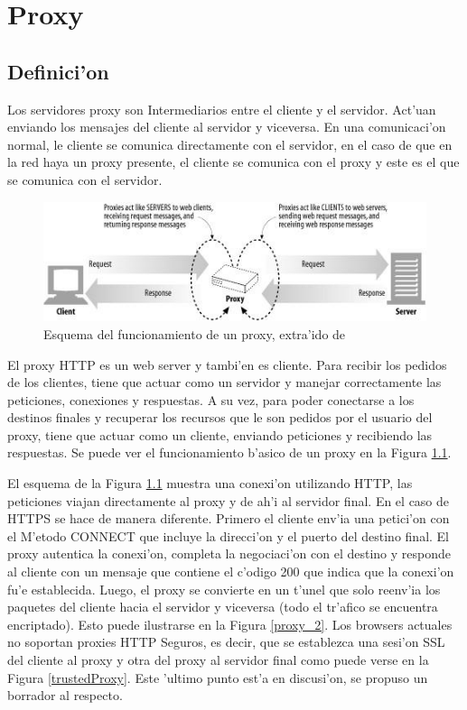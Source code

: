 \chapter{Proxy}
\label{proxy}
\section{Definici'on}

Los servidores proxy son Intermediarios entre el cliente y el servidor. Act'uan enviando los mensajes del cliente al servidor y viceversa. En una comunicaci'on normal, le cliente se comunica directamente con el servidor, en el caso de que en la red haya un proxy presente, el cliente se comunica con el proxy y este es el que se comunica con el servidor.

\begin{figure}[ht!]
  	\centering
	\includegraphics[width=\textwidth]{img/proxy_1}
	\caption{\small Esquema del funcionamiento de un proxy, extra'ido de \cite{httpGuide}}
	\label{proxy_1}
\end{figure}

El proxy HTTP es un web server y tambi'en es cliente. Para recibir los pedidos de los clientes, tiene que actuar como un servidor y manejar correctamente las peticiones, conexiones y respuestas. A su vez, para poder conectarse a los destinos finales y recuperar los recursos que le son pedidos por el usuario del proxy, tiene que actuar como un cliente, enviando peticiones y recibiendo las respuestas. Se puede ver el funcionamiento b'asico de un proxy en la Figura \ref{proxy_1}.

El esquema de la Figura \ref{proxy_1} muestra una conexi'on utilizando HTTP, las peticiones viajan directamente al proxy y de ah'i al servidor final. En el caso de HTTPS se hace de manera diferente. Primero el cliente env'ia una petici'on con el M'etodo CONNECT que incluye la direcci'on y el puerto del destino final. El proxy autentica la conexi'on, completa la negociaci'on con el destino y responde al cliente con un mensaje que contiene el c'odigo 200 que indica que la conexi'on fu'e establecida. Luego, el proxy se convierte en un t'unel que solo reenv'ia los paquetes del cliente hacia el servidor y viceversa (todo el tr'afico se encuentra encriptado). Esto puede ilustrarse en la Figura \ref{proxy_2}.
\label{mitm}
Los browsers actuales no soportan proxies HTTP Seguros, es decir, que se establezca una sesi'on SSL del cliente al proxy y otra del proxy al servidor final como puede verse en la Figura \ref{trustedProxy}. Este 'ultimo punto est'a en discusi'on, se propuso un borrador \citep{draftTrustedProxy} al respecto.

